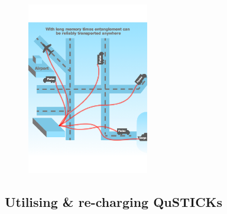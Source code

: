 \documentclass[twocolumn, aps, rmp, amsmath, amssymb, nofootinbib, superscriptaddress, longbibliography, floatfix, table-of-contents, eqsecnum]{revtex4-2}
\begin{document}
\begin{figure}[htbp!]
	\includegraphics[clip=true, width=0.475\textwidth]{qustick3}
	\caption{} \label{fig:distribution}
\end{figure}

\subsection{Utilising \& re-charging QuSTICKs}
\end{document}
